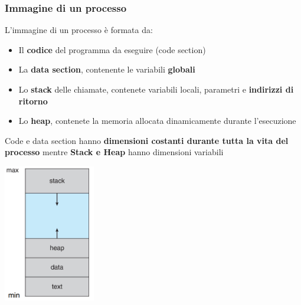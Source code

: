\documentclass[12pt]{article}
\begin{document}
\subsubsection{Immagine di un processo}
L'immagine di un processo è formata da:
\begin{itemize}
    \item Il \textbf{codice} del programma da eseguire (code section)
    \item La \textbf{data section}, contenente le variabili \textbf{globali}
    \item Lo \textbf{stack} delle chiamate, contenete variabili locali, parametri e \textbf{indirizzi di ritorno}
    \item Lo \textbf{heap}, contenete la memoria allocata dinamicamente durante l'esecuzione
\end{itemize}
Code e data section hanno \textbf{dimensioni costanti durante tutta la vita del processo} mentre \textbf{Stack e Heap} hanno dimensioni variabili
\begin{center}
    \includegraphics[width = 0.30\textwidth]{Images/53.PNG}
\end{center}
\end{document}
